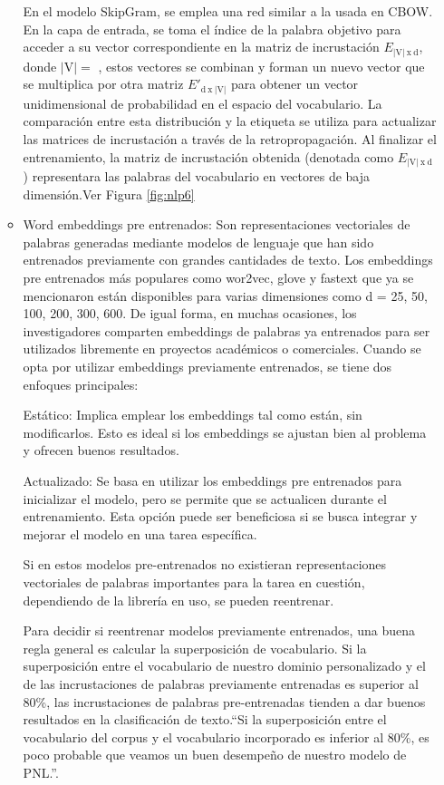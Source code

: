 \begin{itemize}
\begin{itemize}
En el modelo SkipGram, se emplea una red similar a la usada en CBOW. En la capa de entrada, se toma el índice de la palabra objetivo para acceder a su vector correspondiente en la matriz de incrustación $E_{ \left | \textrm{V}  \right |\: \textrm{x} \: \textrm{d}}$,  donde $\left | \textrm{V}  \right | = $  , estos vectores se combinan y forman un nuevo vector que se multiplica por otra matriz ${E}'_{ \textrm{d} \: \textrm{x}  \:\left | \textrm{V}  \right | }$  para obtener un vector unidimensional de probabilidad en el espacio del vocabulario. La comparación entre esta distribución y la etiqueta se utiliza para actualizar las matrices de incrustación a través de la retropropagación. Al finalizar el entrenamiento, la matriz de incrustación obtenida (denotada como $E_{ \left | \textrm{V}  \right |\: \textrm{x} \: \textrm{d}}$) representara las palabras del vocabulario en vectores de baja dimensión.Ver Figura \ref{fig:nlp6}

	\item Word embeddings pre entrenados:  Son representaciones vectoriales de palabras generadas mediante modelos de lenguaje que han sido entrenados previamente con grandes cantidades de texto. Los embeddings pre entrenados más populares como wor2vec, glove y fastext que ya se mencionaron están disponibles para varias dimensiones como d = 25, 50, 100, 200, 300, 600. De igual forma, en muchas ocasiones, los investigadores comparten embeddings de palabras ya entrenados para ser utilizados libremente en proyectos académicos o comerciales. Cuando se opta por utilizar embeddings previamente entrenados, se tiene dos enfoques principales:
	
Estático: Implica emplear los embeddings tal como están, sin modificarlos. Esto es ideal si los embeddings se ajustan bien al problema y ofrecen buenos resultados.

Actualizado: Se basa en utilizar los embeddings pre entrenados para inicializar el modelo, pero se permite que se actualicen durante el entrenamiento. Esta opción puede ser beneficiosa si se busca integrar y mejorar el modelo en una tarea específica.

Si en estos modelos pre-entrenados no existieran representaciones vectoriales de palabras importantes para la tarea en cuestión, dependiendo de la librería en uso, se pueden reentrenar. 

Para decidir si reentrenar modelos previamente entrenados, una buena regla general es calcular la superposición de vocabulario. Si la superposición entre el vocabulario de nuestro dominio personalizado y el de las incrustaciones de palabras previamente entrenadas es superior al 80\%, las incrustaciones de palabras pre-entrenadas tienden a dar buenos resultados en la clasificación de texto.``Si la superposición entre el vocabulario del corpus y el vocabulario incorporado es inferior al 80\%, es poco probable que veamos un buen desempeño de nuestro modelo de PNL.''\cite[p. 104]{vajjala2020practical}.


\end{itemize}
\end{itemize}
